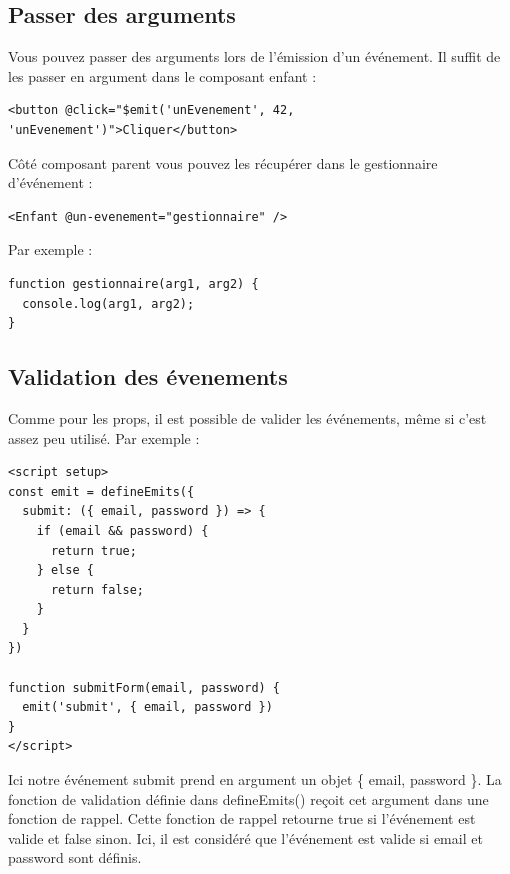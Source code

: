 \subsection{Passer des arguments}
Vous pouvez passer des arguments lors de l'émission d'un événement. Il suffit de les passer en argument dans le composant enfant :
\begin{verbatim}
<button @click="$emit('unEvenement', 42, 'unEvenement')">Cliquer</button>
\end{verbatim}
Côté composant parent vous pouvez les récupérer dans le gestionnaire d'événement :
\begin{verbatim}
<Enfant @un-evenement="gestionnaire" />
\end{verbatim}
Par exemple :
\begin{verbatim}
function gestionnaire(arg1, arg2) {
  console.log(arg1, arg2);
}
\end{verbatim}

\subsection{Validation des évenements}
Comme pour les {\color{monOrange}props}, il est possible de valider les événements, même si c'est assez peu utilisé. Par exemple :
\begin{verbatim}
<script setup>
const emit = defineEmits({
  submit: ({ email, password }) => {
    if (email && password) {
      return true;
    } else {
      return false;
    }
  }
})

function submitForm(email, password) {
  emit('submit', { email, password })
}
</script>
\end{verbatim}
Ici notre événement {\color{monOrange}submit} prend en argument un objet  {\color{monOrange}\{ email, password \}}. La fonction de validation définie dans {\color{monOrange}defineEmits()} reçoit cet argument dans une fonction de rappel. Cette fonction de rappel retourne {\color{monOrange}true} si l'événement est valide et false sinon. Ici, il est considéré que l'événement est valide si {\color{monOrange}email} et {\color{monOrange}password} sont définis.

